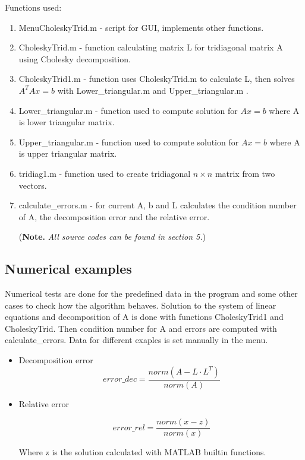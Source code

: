 \documentclass[12pt]{article}
\begin{document}
\vskip 5pt

\noindent Functions used:
\begin{enumerate}
	\item MenuCholeskyTrid.m - script for GUI, implements other functions.
	\item CholeskyTrid.m - function calculating matrix L for tridiagonal matrix A using Cholesky decomposition.
	\item CholeskyTrid1.m - function uses CholeskyTrid.m to calculate L, then solves  $A^{T}Ax=b$ with Lower\_triangular.m and Upper\_triangular.m .
	\item Lower\_triangular.m - function used to compute solution for $Ax=b$ where A is lower triangular matrix.
	\item Upper\_triangular.m - function used to compute solution for $Ax=b$ where A is upper triangular matrix.
	\item tridiag1.m - function used to create tridiagonal $n\times n$ matrix from two vectors.
	\item calculate\_errors.m - for current A, b and L calculates the condition number of A, the decomposition error and the relative error.
	
	\noindent ({\bf Note.} \emph{All source codes can be found in section 5.})
\end{enumerate}

\begin{center}
\section{Numerical examples}
\end{center}

\noindent Numerical tests are done for the predefined data in the program and some other cases to check how the algorithm behaves. Solution to the system of linear equations and decomposition of A is done with functions CholeskyTrid1 and CholeskyTrid. Then condition number for A and errors are computed with calculate\_errors. Data for different exaples is set manually in the menu.

\bigskip

\begin{itemize}
	\item Decomposition error
	\[
	error\_dec = \frac{norm(A - L \cdot L^{T})}{norm(A)}
	\]
	\item Relative error
	
	\[
	error\_rel = \frac{ norm(x - z)}{norm(x)}
	\]
	
	\quad Where z is the solution calculated with MATLAB builtin functions.
\end{itemize}
\end{document}

